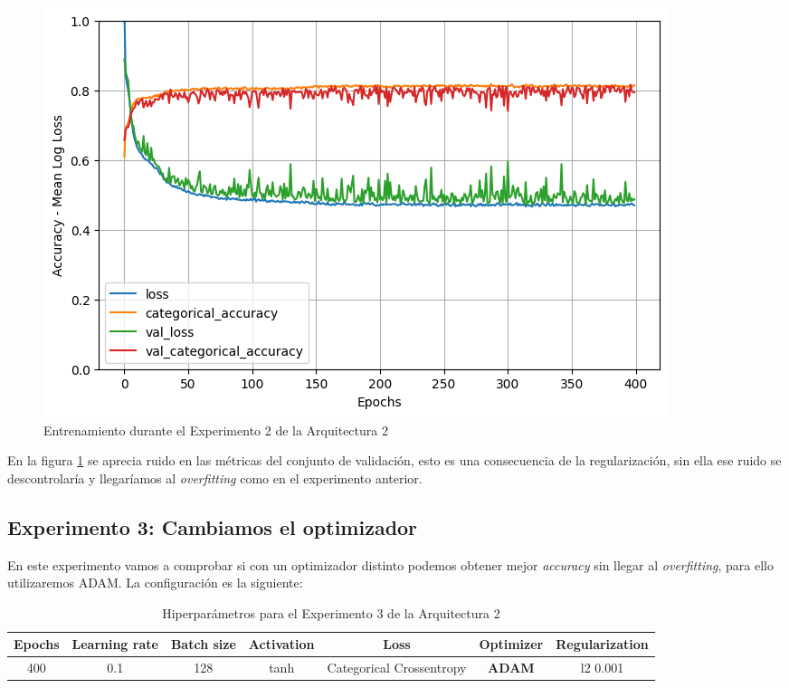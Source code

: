 \documentclass{article}
\begin{document}
			\begin{figure}[!h]
				\begin{center}
					\includegraphics[scale=0.5]{d-tr-a2-e2.png}		
					\caption{Entrenamiento durante el Experimento 2 de la Arquitectura 2}	
					\label{d-tr-a2-e2}
				\end{center}
			\end{figure}
			
			En la figura \ref{d-tr-a2-e2} se aprecia ruido en las m\'etricas del conjunto de validaci\'on, esto es una consecuencia de la regularizaci\'on, sin ella ese ruido se descontrolar\'ia y llegar\'iamos al \textit{overfitting} como en el experimento anterior.
			
			
		\subsection{Experimento 3: Cambiamos el optimizador}
		\label{d-s-a2-e3}
			En este experimento vamos a comprobar si con un optimizador distinto podemos obtener mejor \textit{accuracy} sin llegar al \textit{overfitting}, para ello utilizaremos ADAM. La configuraci\'on es la siguiente:
			
			\begin{table}[!h]
				\begin{center}
					\begin{tabular}{| c | c | c | c | c | c | c |}
						\textbf{Epochs} & \textbf{Learning rate} & \textbf{Batch size} & \textbf{Activation} & \textbf{Loss} & \textbf{Optimizer} & \textbf{Regularization} \\ \hline
						400 & 0.1 & 128 & tanh & Categorical Crossentropy & \textbf{ADAM} & l2 0.001
					\end{tabular}
					\caption{Hiperpar\'ametros para el Experimento 3 de la Arquitectura 2}
					\label{tab:hip-d-a2-e3}
				\end{center}
			\end{table}
			
\end{document}

